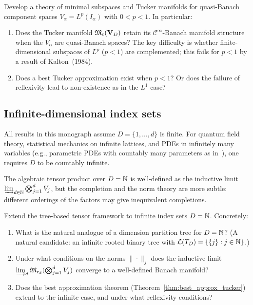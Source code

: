 \begin{problem}
\label{prob:quasi-banach}
Develop a theory of minimal subspaces and Tucker manifolds for
quasi-Banach component spaces $V_\alpha = L^p(I_\alpha)$ with
$0 < p < 1$. In particular:
\begin{enumerate}
\item[\textup{(a)}] Does the Tucker manifold $\mathfrak{M}_{\mathfrak{r}}(\mathbf{V}_D)$
    retain its $\mathcal{C}^\infty$-Banach manifold structure when
    the $V_\alpha$ are quasi-Banach spaces? The key difficulty is
    whether finite-dimensional subspaces of $L^p$ ($p < 1$) are
    complemented; this fails for $p < 1$ by a result of
    Kalton~(1984).
\item[\textup{(b)}] Does a best Tucker approximation exist when
    $p < 1$? Or does the failure of reflexivity lead to non-existence
    as in the $L^1$ case?
\end{enumerate}
\end{problem}

\subsection*{Infinite-dimensional index sets}

All results in this monograph assume $D = \{1, \ldots, d\}$ is finite.
For quantum field theory, statistical mechanics on infinite lattices,
and PDEs in infinitely many variables (e.g., parametric PDEs with
countably many parameters as in~\cite{Nouy2017}), one requires $D$ to
be countably infinite.

The algebraic tensor product over $D = \mathbb{N}$ is well-defined as the
inductive limit $\varinjlim_{d \in \mathbb{N}} \bigotimes_{j=1}^d V_j$, but
the completion and the norm theory are more subtle: different orderings
of the factors may give inequivalent completions.

\begin{problem}
\label{prob:infinite_D}
Extend the tree-based tensor framework to infinite index sets $D = \mathbb{N}$.
Concretely:
\begin{enumerate}
\item[\textup{(a)}] What is the natural analogue of a dimension partition
    tree for $D = \mathbb{N}$? (A natural candidate: an infinite rooted binary
    tree with $\mathcal{L}(T_D) = \{\{j\} : j \in \mathbb{N}\}$.)
\item[\textup{(b)}] Under what conditions on the norms $\|\cdot\|_j$
    does the inductive limit $\varinjlim_d \mathfrak{M}_{\mathfrak{r}_d}(\bigotimes_{j=1}^d V_j)$
    converge to a well-defined Banach manifold?
\item[\textup{(c)}] Does the best approximation theorem
    (Theorem~\ref{thm:best_approx_tucker}) extend to the infinite case,
    and under what reflexivity conditions?
\end{enumerate}
\end{problem}

